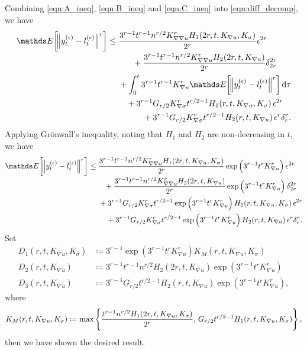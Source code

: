 Combining \cref{eqn:A_ineq}, \cref{eqn:B_ineq} and \cref{eqn:C_ineq} into \cref{eqn:diff_decomp}, we have
\[
	\avg{\norm{y_t^{(\epsilon)} - l_t^{(\epsilon)}}^r} \leq \begin{multlined}[t]
		\frac{3^{r-1} t^{r-1}n^{r/2}K_{\nabla\nabla u}^r H_1\!\left(2r,t, K_{\nabla u}, K_{\sigma}\right)}{2^r}\epsilon^{2r} \\
		+ \frac{3^{r-1} t^{r-1} n^{r/2} K_{\nabla\nabla u}^r H_2\!\left(2r,t, K_{\nabla u}\right)}{2^r}\delta_{2r}^{2r} \\
		+ \int_0^t{3^{r-1}t^{r-1}K_{\nabla u}^r\avg{\norm{y_t^{(\epsilon)} - l_t^{(\epsilon)}}^r}\dif\tau} \\
		+ 3^{r-1}G_{r/2} K_{\nabla\sigma}^r t^{r/2 - 1} H_1\!\left(r,t, K_{\nabla u}, K_{\sigma}\right)\epsilon^{2r} \\
		+ 3^{r-1} G_{r/2} K_{\nabla\sigma}^r t^{r/2 - 1} H_2\!\left(r,t, K_{\nabla u}\right)\epsilon^r\delta_r^r.
	\end{multlined}
\]
Applying Gr\"{o}nwall's inequality, noting that \(H_1\) and \(H_2\) are non-decreasing in \(t\), we have
\[
	\avg{\norm{y_t^{(\epsilon)} - l_t^{(\epsilon)}}^r} \leq \begin{multlined}[t]
		\frac{3^{r-1} t^{r-1}n^{r/2}K_{\nabla\nabla u}^r H_1\!\left(2r,t, K_{\nabla u}, K_{\sigma}\right)}{2^r}\exp\left(3^{r-1}t^r K_{\nabla u}^r\right)\epsilon^{2r} \\
		+ \frac{3^{r-1} t^{r-1} n^{r/2} K_{\nabla\nabla u}^r H_2\!\left(2r,t, K_{\nabla u}\right)}{2^r}\exp\left(3^{r-1}t^r K_{\nabla u}^r\right)\delta_{2r}^{2r} \\
		+ 3^{r-1}G_{r/2} K_{\nabla\sigma}^r t^{r/2 - 1}\exp\left(3^{r-1}t^r K_{\nabla u}^r\right) H_1\!\left(r,t, K_{\nabla u}, K_{\sigma}\right)\epsilon^{2r} \\
		+ 3^{r-1} G_{r/2} K_{\nabla\sigma}^r t^{r/2 - 1}\exp\left(3^{r-1}t^r K_{\nabla u}^r\right) H_2\!\left(r,t, K_{\nabla u}\right)\epsilon^r\delta_r^r.
	\end{multlined}
\]
Set
\begin{subequations}\label{eqn:bound_defns}
	\begin{align}
		D_1\!\left(r,t, K_{\nabla u}, K_\sigma\right) & \coloneqq 3^{r-1}\exp\left(3^{r-1} t^r K_{\nabla u}^r\right)K_{M}\!\left(r, t, K_{\nabla u}, K_\sigma\right)        \\
		D_2\!\left(r,t, K_{\nabla u}\right)           & \coloneqq 3^{r-1}t^{r-1} n^{r/2}H_{2}\!\left(2r,t, K_{\nabla u}\right)\exp\left(3^{r-1}t^r K_{\nabla u}^r\right)    \\
		D_3\!\left(r,t, K_{\nabla u}\right)           & \coloneqq 3^{r-1}G_{r/2} t^{r/2 - 1} H_2\!\left(r,t, K_{\nabla u}\right)\exp\left(3^{r-1}t^r K_{\nabla u}^r\right),
	\end{align}
\end{subequations}
where
\[
	K_{M}\!\left(r, t, K_{\nabla u}, K_\sigma\right) \coloneqq \max\set{\frac{t^{r-1}n^{r/2}H_{1}\!\left(2r,t, K_{\nabla u}, K_{\sigma}\right)}{2^r},\, G_{r/2} t^{r/2 - 1} H_1\!\left(r,t, K_{\nabla u}, K_{\sigma}\right)},
\]
then we have shown the desired result.



